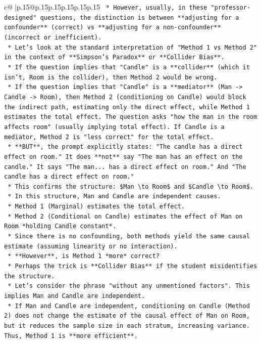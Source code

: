 \documentclass{article}
\begin{document}
{\begin{supertabular}{c@{$\;$}|p{.15\linewidth}@{}p{.15\linewidth}p{.15\linewidth}p{.15\linewidth}p{.15\linewidth}p{.15\linewidth}}
{{{\texttt{    *   However, usually, in these "professor{-}designed" questions, the distinction is between **adjusting for a confounder** (correct) vs **adjusting for a non{-}confounder** (incorrect or inefficient).} \\
\texttt{    *   Let's look at the standard interpretation of "Method 1 vs Method 2" in the context of **Simpson's Paradox** or **Collider Bias**.} \\
\texttt{    *   If the question implies that "Candle" is a **collider** (which it isn't, Room is the collider), then Method 2 would be wrong.} \\
\texttt{    *   If the question implies that "Candle" is a **mediator** (Man {-}> Candle {-}> Room), then Method 2 (conditioning on Candle) would block the indirect path, estimating only the direct effect, while Method 1 estimates the total effect. The question asks "how the man in the room affects room" (usually implying total effect). If Candle is a mediator, Method 2 is "less correct" for the total effect.} \\
\texttt{    *   **BUT**, the prompt explicitly states: "The candle has a direct effect on room." It does **not** say "The man has an effect on the candle." It says "The man... has a direct effect on room." And "The candle has a direct effect on room."} \\
\texttt{    *   This confirms the structure: \$Man \textbackslash{}to Room\$ and \$Candle \textbackslash{}to Room\$.} \\
\texttt{    *   In this structure, Man and Candle are independent causes.} \\
\texttt{    *   Method 1 (Marginal) estimates the total effect.} \\
\texttt{    *   Method 2 (Conditional on Candle) estimates the effect of Man on Room *holding Candle constant*.} \\
\texttt{    *   Since there is no confounding, both methods yield the same causal estimate (assuming linearity or no interaction).} \\
\texttt{    *   **However**, is Method 1 *more* correct?} \\
\texttt{    *   Perhaps the trick is **Collider Bias** if the student misidentifies the structure.} \\
\texttt{    *   Let's consider the phrase "without any unmentioned factors". This implies Man and Candle are independent.} \\
\texttt{    *   If Man and Candle are independent, conditioning on Candle (Method 2) does not change the estimate of the causal effect of Man on Room, but it reduces the sample size in each stratum, increasing variance. Thus, Method 1 is **more efficient**.} \\
}}}
\end{supertabular}}
\end{document}
